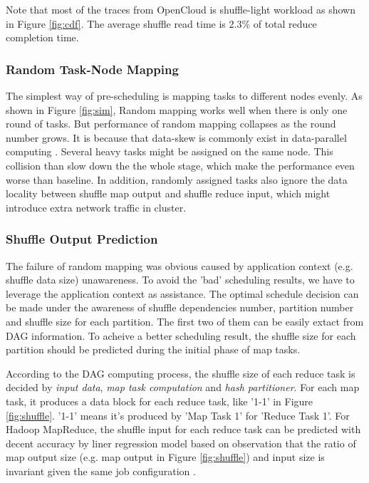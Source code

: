 Note that most of the traces from OpenCloud is shuffle-light workload as shown in Figure \ref{fig:cdf}. The average shuffle read time is 2.3\% of total reduce completion time.

\subsubsection{Random Task-Node Mapping}\label{randomassign}
The simplest way of pre-scheduling is mapping tasks to different nodes evenly.  As shown in Figure \ref{fig:sim}, Random mapping works well when there is only one round of tasks. But performance of random mapping collapses as the round number grows. It is because that data-skew is commonly exist in data-parallel computing \cite{skewtune, reining, gufler2012load}. Several heavy tasks might be assigned on the same node. This collision than slow down the the whole stage, which make the performance even worse than baseline. In addition, randomly assigned tasks also ignore the data locality between shuffle map output and shuffle reduce input, which might introduce extra network traffic in cluster. 


\subsubsection{Shuffle Output Prediction}\label{shuffleprediction}
The failure of random mapping was obvious caused by application context (e.g. shuffle data size) unawareness. To avoid the 'bad' scheduling results, we have to leverage the application context as assistance. The optimal schedule decision can be made under the awareness of shuffle dependencies number, partition number and shuffle size for each partition. The first two of them can be easily extact from DAG information. To acheive a better scheduling result, the shuffle size for each partition should be predicted during the initial phase of map tasks.

According to the DAG computing process, the shuffle size of each reduce task is decided by \textit{input data}, \textit{map task computation} and \textit{hash partitioner}. For each map task, it produces a data block for each reduce task, like '1-1' in Figure \ref{fig:shuffle}. '1-1' means it's produced by 'Map Task 1' for 'Reduce Task 1'. For Hadoop MapReduce, the shuffle input for each reduce task can be predicted with decent accuracy \cite{ishuffle} by liner regression model based on observation that the ratio of map output size (e.g. map output in Figure \ref{fig:shuffle}) and input size is invariant given the same job configuration \cite{predict}. 


